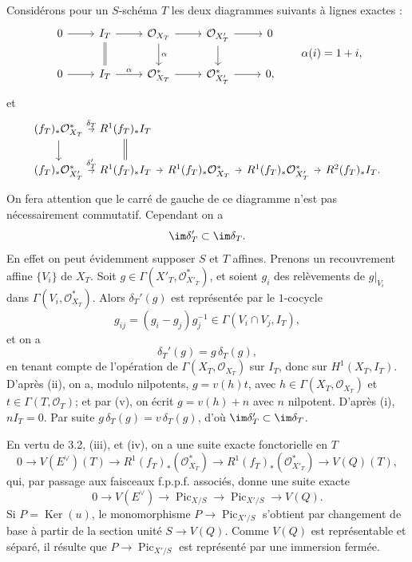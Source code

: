 \documentclass[11pt]{article}
\providecommand{\Pic}{\operatorname{Pic}}
\providecommand{\Ker}{\operatorname{Ker}}
\begin{document}
Considérons pour un \(S\)-schéma \(T\) les deux diagrammes suivants à lignes exactes :
\[
\begin{tikzcd}
0 \arrow[r] & I_T \arrow[r] \arrow[d,equal] & \mathcal O_{X_T} \arrow[r] \arrow[d,"\alpha"] & \mathcal O_{X'_T} \arrow[r] \arrow[d] & 0\\
0 \arrow[r] & I_T \arrow[r,"\alpha"] & \mathcal O_{X_T}^{*} \arrow[r] & \mathcal O_{X'_T}^{*} \arrow[r] & 0 ,
\end{tikzcd}
\qquad \alpha(i)=1+i,
\]
et
\[
\begin{tikzcd}[column sep=tiny]
(f_T)_*\mathcal O_{X_T}^{*} \arrow[r,"\delta_T"] \arrow[d] &
R^1(f_T)_* I_T \arrow[d,equal]\\
(f_T)_*\mathcal O_{X'_T}^{*} \arrow[r,"\delta_T'"] &
R^1(f_T)_* I_T \arrow[r] &
R^1(f_T)_*\mathcal O_{X_T}^{*} \arrow[r] &
R^1(f_T)_*\mathcal O_{X'_T}^{*} \arrow[r] &
R^2(f_T)_* I_T .
\end{tikzcd}
\]
On fera attention que le carré de gauche de ce diagramme n'est pas nécessairement commutatif. Cependant on a
\[
  \im\delta_T'\subset\im\delta_T.
\]
En effet on peut évidemment supposer \(S\) et \(T\) affines. Prenons un recouvrement affine \(\{V_i\}\) de \(X_T\). Soit \(g\in\Gamma(X'_T,\mathcal O_{X'_T}^{*})\), et soient \(g_i\) des relèvements de \(g|_{V_i}\) dans \(\Gamma(V_i,\mathcal O_{X_T}^{*})\). Alors \(\delta_T'(g)\) est représentée par le \(1\)-cocycle
\[
  g_{ij}=(g_i-g_j)g_j^{-1}\in\Gamma(V_i\cap V_j,I_T),
\]
et on a
\[
  \delta_T'(g)=g\,\delta_T(g),
\]
en tenant compte de l'opération de \(\Gamma(X_T,\mathcal O_{X_T})\) sur \(I_T\), donc sur \(H^1(X_T,I_T)\). D'après (ii), on a, modulo nilpotents, \(g=v(h)t\), avec \(h\in\Gamma(X_T,\mathcal O_{X_T})\) et \(t\in\Gamma(T,\mathcal O_T)\); et par (v), on écrit \(g=v(h)+n\) avec \(n\) nilpotent. D'après (i), \(nI_T=0\). Par suite \(g\,\delta_T(g)=v\,\delta_T(g)\), d'où \(\im\delta_T'\subset\im\delta_T\).

En vertu de 3.2, (iii), et (iv), on a une suite exacte fonctorielle en \(T\)
\[
  0\longrightarrow V(E^\vee)(T)\longrightarrow
  R^1(f_T)_*(\mathcal O_{X_T}^{*})
  \longrightarrow
  R^1(f_T)_*(\mathcal O_{X'_T}^{*})
  \longrightarrow
  V(Q)(T),
\]
qui, par passage aux faisceaux f.p.p.f. associés, donne une suite exacte
\[
  0\longrightarrow V(E^\vee)\longrightarrow\Pic_{X/S}
  \longrightarrow\Pic_{X'/S}\longrightarrow V(Q).
\]
Si \(P=\Ker(u)\), le monomorphisme \(P\to\Pic_{X'/S}\) s'obtient par changement de base à partir de la section unité \(S\to V(Q)\). Comme \(V(Q)\) est représentable et séparé, il résulte que \(P\to\Pic_{X'/S}\) est représenté par une immersion fermée.
\end{document}
